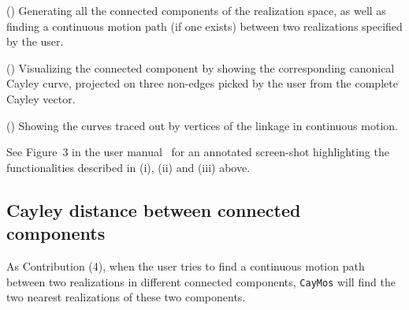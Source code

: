 \documentclass[prodmode,acmtoms]{acmsmall}
\begin{document}
\noindent() Generating all the connected components of the realization space,
as well as finding a continuous motion path (if one exists) between two realizations specified by the user.

\noindent() Visualizing the connected component by showing the corresponding canonical Cayley curve, projected on three non-edges picked by the user from the complete Cayley vector. 



\noindent() Showing the curves traced out by vertices of the linkage in continuous motion. 


See Figure~3 in the user manual~\cite{userman} for an annotated
screen-shot highlighting the functionalities described
in (i), (ii) and (iii) above.



\subsection{Cayley distance between connected components}\label{subsec:distance}


As Contribution  (4), 
when the user tries to find a continuous motion path between two realizations in different connected components, 
\texttt{CayMos} will
find the two nearest realizations of these two components.


\end{document}
